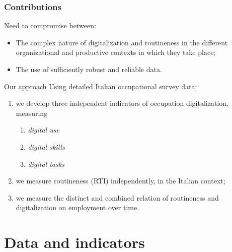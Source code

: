 \documentclass[10pt,xcolor={usenames,dvipsnames}]{beamer}
\begin{document}
\begin{frame} 
\frametitle{Contributions}

Need to compromise between:
\begin{itemize}
\item The complex nature of digitalization and routineness in the different organizational and productive contexts in which they take place; 
\item The use of sufficiently robust and reliable data.
\end{itemize}
\begin{exampleblock}{Our approach}
Using detailed Italian occupational survey data:
\begin{enumerate}
    \item we develop three independent indicators of occupation digitalization, measuring
    \begin{enumerate}
        \item \emph{digital use}
        \item \emph{digital skills}
        \item \emph{digital tasks}
    \end{enumerate}
    \item we measure routineness (RTI) independently, in the Italian context;
    \item we measure the distinct and combined relation of routineness and digitalization on employment over time.
\end{enumerate}
\end{exampleblock}
\end{frame}


\section{Data and indicators}
\end{document}
